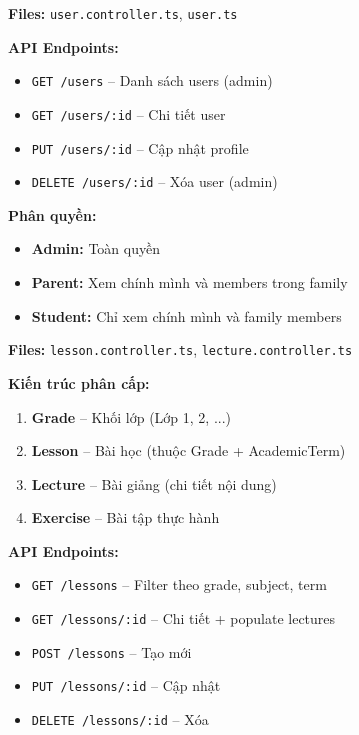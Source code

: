 
\textbf{Files:} \texttt{user.controller.ts}, \texttt{user.ts}

\textbf{API Endpoints:}
\begin{itemize}
\item \texttt{GET /users} -- Danh sách users (admin)
\item \texttt{GET /users/:id} -- Chi tiết user
\item \texttt{PUT /users/:id} -- Cập nhật profile
\item \texttt{DELETE /users/:id} -- Xóa user (admin)
\end{itemize}

\textbf{Phân quyền:}
\begin{itemize}
\item \textbf{Admin:} Toàn quyền
\item \textbf{Parent:} Xem chính mình và members trong family
\item \textbf{Student:} Chỉ xem chính mình và family members
\end{itemize}


\textbf{Files:} \texttt{lesson.controller.ts}, \texttt{lecture.controller.ts}

\textbf{Kiến trúc phân cấp:}
\begin{enumerate}
\item \textbf{Grade} -- Khối lớp (Lớp 1, 2, ...)
\item \textbf{Lesson} -- Bài học (thuộc Grade + AcademicTerm)
\item \textbf{Lecture} -- Bài giảng (chi tiết nội dung)
\item \textbf{Exercise} -- Bài tập thực hành
\end{enumerate}

\textbf{API Endpoints:}
\begin{itemize}
\item \texttt{GET /lessons} -- Filter theo grade, subject, term
\item \texttt{GET /lessons/:id} -- Chi tiết + populate lectures
\item \texttt{POST /lessons} -- Tạo mới
\item \texttt{PUT /lessons/:id} -- Cập nhật
\item \texttt{DELETE /lessons/:id} -- Xóa
\end{itemize}


